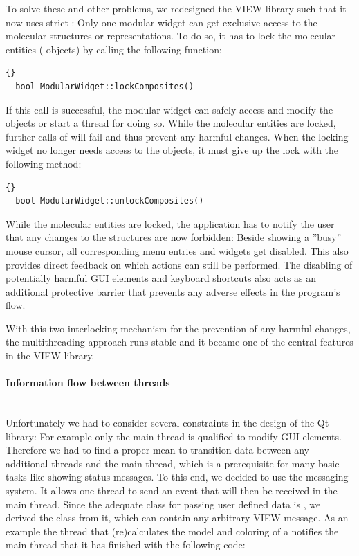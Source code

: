 To solve these and other problems, we redesigned the VIEW library such that 
it now uses strict : Only one modular widget can get 
exclusive access to the molecular structures or representations. To do so, it 
has to lock the molecular entities (\ie {} objects) by calling 
the following function:

\begin{lstlisting}{}
  bool ModularWidget::lockComposites()
\end{lstlisting}

\noindent
If this call is successful, the modular widget can safely access and modify 
the  objects or start a thread for doing so. While the 
molecular entities are locked, further calls of  will
fail and thus prevent any harmful changes. When the locking widget no longer 
needs access to the  objects, it must give up the lock with 
the following method:

\begin{lstlisting}{}
  bool ModularWidget::unlockComposites()
\end{lstlisting}

\noindent
While the molecular entities are locked, the application has to notify the 
user that any changes to the structures are now forbidden: Beside showing a 
''busy'' mouse cursor, all corresponding menu entries and widgets get 
disabled. This also provides direct feedback on which actions can still be 
performed. The disabling of potentially harmful GUI elements and keyboard 
shortcuts also acts as an additional protective barrier that prevents any 
adverse effects in the program's flow.

With this two interlocking mechanism for the prevention of any harmful 
changes, the multithreading approach runs stable and it became one of the 
central features in the VIEW library.

\paragraph{Information flow between threads}
\hspace*{\fill}\\
Unfortunately we had to consider several constraints in the design of the Qt 
library: For example only the main thread is qualified to modify GUI elements. 
Therefore we had to find a proper mean to transition data between any 
additional threads and the main thread, which is a prerequisite for many 
basic tasks like showing status messages. To this end, we decided to use the 
 messaging system. It allows one thread to send an event that 
will then be received in the main thread. Since the adequate class for passing 
user defined data is , we derived the class 
 from it, which can contain any arbitrary VIEW message.
As an example the thread that (re)calculates the model and coloring of a 
 notifies the main thread that it has finished with the 
following code:

